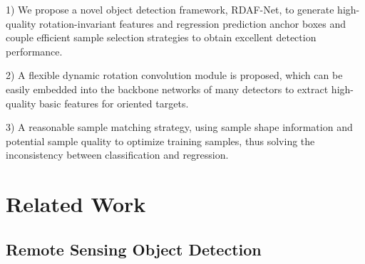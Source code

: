 \documentclass[journal]{IEEEtran}
\begin{document}
1) We propose a novel object detection framework, RDAF-Net, to generate high-quality rotation-invariant features and regression prediction anchor boxes and couple efficient sample selection strategies to obtain excellent detection performance.

2) A flexible dynamic rotation convolution module is proposed, which can be easily embedded into the backbone networks of many detectors to extract high-quality basic features for oriented targets.

3) A reasonable sample matching strategy, using sample shape information and potential sample quality to optimize training samples, thus solving the inconsistency between classification and regression.

\section{ Related Work }

\subsection{ Remote Sensing Object Detection }
\end{document}
